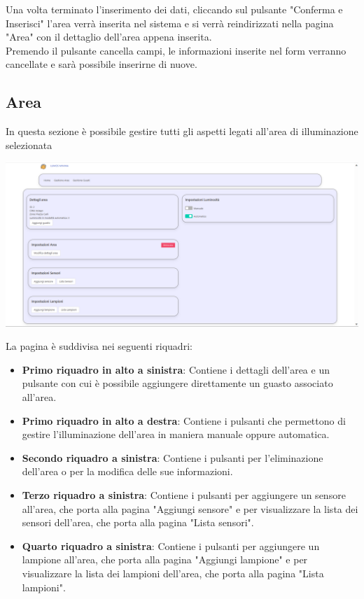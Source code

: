 \documentclass[9pt]{article}
\begin{document}
Una volta terminato l'inserimento dei dati, cliccando sul pulsante "Conferma e Inserisci"
l'area verrà inserita nel sistema e si verrà reindirizzati nella pagina "Area" con il dettaglio dell'area appena inserita.\\
Premendo il pulsante cancella campi, le informazioni inserite nel form verranno cancellate e sarà possibile inserirne di nuove.
\subsection{Area}

In questa sezione è possibile gestire tutti gli aspetti legati all'area di illuminazione selezionata

\begin{center}
	\includegraphics[scale=0.3]{Area.png}
\end{center}

La pagina è suddivisa nei seguenti riquadri:
\begin{itemize}
	\item \textbf{Primo riquadro in alto a sinistra}: Contiene i dettagli dell'area e un pulsante con cui è possibile aggiungere direttamente un guasto associato all'area.
	\item \textbf{Primo riquadro in alto a destra}: Contiene i pulsanti che permettono di gestire l'illuminazione dell'area in maniera manuale oppure automatica.
	\item \textbf{Secondo riquadro a sinistra}: Contiene i pulsanti per l'eliminazione dell'area o per la modifica delle sue informazioni.
	\item \textbf{Terzo riquadro a sinistra}: Contiene i pulsanti per aggiungere un sensore all'area, che porta alla pagina "Aggiungi sensore" e per visualizzare la lista dei sensori dell'area, che porta alla pagina "Lista sensori".
	\item \textbf{Quarto riquadro a sinistra}: Contiene i pulsanti per aggiungere un lampione all'area, che porta alla pagina "Aggiungi lampione" e per visualizzare la lista dei lampioni dell'area, che porta alla pagina "Lista lampioni".
\end{itemize}
\end{document}
